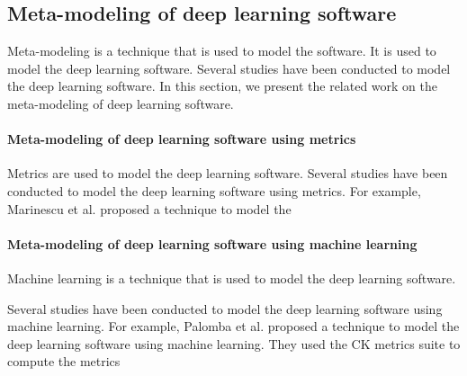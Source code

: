 \subsection{Meta-modeling of deep learning software}
Meta-modeling is a technique that is used to model the software. It is used to
model the deep learning software. Several studies have been conducted to model
the deep learning software. In this section, we present the related work on the
meta-modeling of deep learning software.

\paragraph{Meta-modeling of deep learning software using metrics}
Metrics are used to model the deep learning software. Several studies have been
conducted to model the deep learning software using metrics. For example,
Marinescu et al. \cite{marinescu2004detection} proposed a technique to model the


\paragraph{Meta-modeling of deep learning software using machine learning}
Machine learning is a technique that is used to model the deep learning
software.

Several studies have been conducted to model the deep learning software using
machine learning. For example, Palomba et al. \cite{palomba2017automatic}
proposed a technique to model the deep learning software using machine learning.
They used the CK metrics suite \cite{chidamber1994metrics} to compute the
metrics










